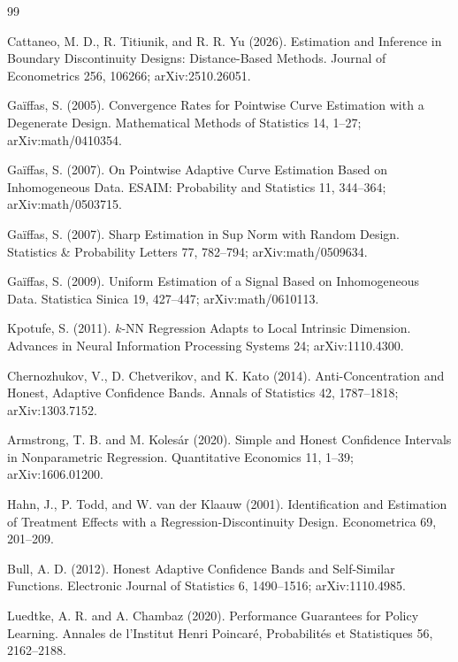 \documentclass{article}
\begin{document}
\begin{thebibliography}{99}

   Cattaneo, M. D., R. Titiunik, and R. R. Yu (2026). Estimation and Inference in Boundary Discontinuity Designs: Distance-Based Methods. Journal of Econometrics 256, 106266; arXiv:2510.26051.

   Gaïffas, S. (2005). Convergence Rates for Pointwise Curve Estimation with a Degenerate Design. Mathematical Methods of Statistics 14, 1--27; arXiv:math/0410354.

   Gaïffas, S. (2007). On Pointwise Adaptive Curve Estimation Based on Inhomogeneous Data. ESAIM: Probability and Statistics 11, 344--364; arXiv:math/0503715.

   Gaïffas, S. (2007). Sharp Estimation in Sup Norm with Random Design. Statistics \& Probability Letters 77, 782--794; arXiv:math/0509634.

   Gaïffas, S. (2009). Uniform Estimation of a Signal Based on Inhomogeneous Data. Statistica Sinica 19, 427--447; arXiv:math/0610113.

   Kpotufe, S. (2011). \(k\)-NN Regression Adapts to Local Intrinsic Dimension. Advances in Neural Information Processing Systems 24; arXiv:1110.4300.

   Chernozhukov, V., D. Chetverikov, and K. Kato (2014). Anti-Concentration and Honest, Adaptive Confidence Bands. Annals of Statistics 42, 1787--1818; arXiv:1303.7152.

   Armstrong, T. B. and M. Kolesár (2020). Simple and Honest Confidence Intervals in Nonparametric Regression. Quantitative Economics 11, 1--39; arXiv:1606.01200.

   Hahn, J., P. Todd, and W. van der Klaauw (2001). Identification and Estimation of Treatment Effects with a Regression-Discontinuity Design. Econometrica 69, 201--209.

   Bull, A. D. (2012). Honest Adaptive Confidence Bands and Self-Similar Functions. Electronic Journal of Statistics 6, 1490--1516; arXiv:1110.4985.

   Luedtke, A. R. and A. Chambaz (2020). Performance Guarantees for Policy Learning. Annales de l'Institut Henri Poincaré, Probabilités et Statistiques 56, 2162--2188.


\end{thebibliography}
\end{document}
